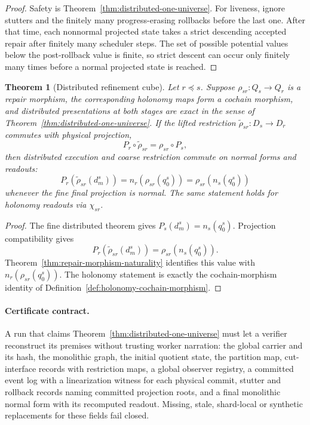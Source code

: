 \documentclass[11pt]{article}
\newtheorem{theorem}{Theorem}[section]
\theoremstyle{remark}
\theoremstyle{plain}
\begin{document}
\begin{proof}
Safety is Theorem~\ref{thm:distributed-one-universe}. For liveness, ignore stutters and the
finitely many progress-erasing rollbacks before the last one. After that time, each nonnormal
projected state takes a strict descending accepted repair after finitely many scheduler steps. The set of possible
potential values below the post-rollback value is finite, so strict descent can occur only
finitely many times before a normal projected state is reached.
\end{proof}

\begin{theorem}[Distributed refinement cube]\label{thm:distributed-refinement-cube}
Let \(r\preceq s\). Suppose \(\rho_{sr}:Q_s\to Q_r\) is a repair morphism, the corresponding
holonomy maps form a cochain morphism, and distributed presentations at both stages are exact in
the sense of Theorem~\ref{thm:distributed-one-universe}. If the lifted restriction
\(\widetilde\rho_{sr}:D_s\to D_r\) commutes with physical projection,
\[
P_r\circ\widetilde\rho_{sr}=\rho_{sr}\circ P_s,
\]
then distributed execution and coarse restriction commute on normal forms and readouts:
\[
P_r\!\left(\widetilde\rho_{sr}(d_m^s)\right)
=
n_r\!\left(\rho_{sr}(q_0^s)\right)
=
\rho_{sr}\!\left(n_s(q_0^s)\right)
\]
whenever the fine final projection is normal. The same statement holds for holonomy readouts via
\(\chi_{sr}\).
\end{theorem}

\begin{proof}
The fine distributed theorem gives \(P_s(d_m^s)=n_s(q_0^s)\). Projection compatibility gives
\[
P_r(\widetilde\rho_{sr}(d_m^s))=\rho_{sr}(n_s(q_0^s)).
\]
Theorem~\ref{thm:repair-morphism-naturality} identifies this value with
\(n_r(\rho_{sr}(q_0^s))\). The holonomy statement is exactly the cochain-morphism identity of
Definition~\ref{def:holonomy-cochain-morphism}.
\end{proof}

\paragraph{Certificate contract.}
A run that claims Theorem~\ref{thm:distributed-one-universe} must let a
verifier reconstruct its premises without trusting worker narration: the
global carrier and its hash, the monolithic graph, the initial quotient
state, the partition map, cut-interface records with restriction maps, a
global observer registry, a committed event log with a linearization witness
for each physical commit, stutter and rollback records naming committed
projection roots, and a final monolithic normal form with its recomputed
readout. Missing, stale, shard-local or synthetic replacements for these
fields fail closed.
\end{document}
